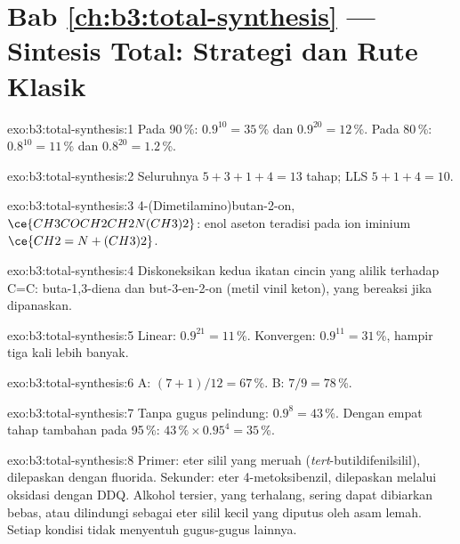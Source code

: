 \section*{Bab \ref{ch:b3:total-synthesis} --- Sintesis Total: Strategi dan Rute Klasik}

\begin{solution}{exo:b3:total-synthesis:1}
Pada 90\,\%: $0.9^{10} = 35$\,\% dan $0.9^{20} = 12$\,\%. Pada 80\,\%: $0.8^{10} = 11$\,\% dan $0.8^{20} = 1.2$\,\%.
\end{solution}

\begin{solution}{exo:b3:total-synthesis:2}
Seluruhnya $5 + 3 + 1 + 4 = 13$ tahap; LLS $5 + 1 + 4 = 10$.
\end{solution}

\begin{solution}{exo:b3:total-synthesis:3}
4-(Dimetilamino)butan-2-on, $\ce{CH3COCH2CH2N(CH3)2}$: enol aseton teradisi pada ion
iminium $\ce{CH2=N+(CH3)2}$.
\end{solution}

\begin{solution}{exo:b3:total-synthesis:4}
Diskoneksikan kedua ikatan cincin yang alilik terhadap C=C: buta-1,3-diena dan but-3-en-2-on
(metil vinil keton), yang bereaksi jika dipanaskan.
\end{solution}

\begin{solution}{exo:b3:total-synthesis:5}
Linear: $0.9^{21} = 11$\,\%. Konvergen: $0.9^{11} = 31$\,\%, hampir tiga kali lebih banyak.
\end{solution}

\begin{solution}{exo:b3:total-synthesis:6}
A: $(7 + 1)/12 = 67$\,\%. B: $7/9 = 78$\,\%.
\end{solution}

\begin{solution}{exo:b3:total-synthesis:7}
Tanpa gugus pelindung: $0.9^8 = 43$\,\%. Dengan empat tahap tambahan pada 95\,\%: $43\,\% \times 0.95^4 = 35$\,\%.
\end{solution}

\begin{solution}{exo:b3:total-synthesis:8}
Primer: eter silil yang meruah (\textit{tert}-butildifenilsilil), dilepaskan dengan fluorida.
Sekunder: eter 4-metoksibenzil, dilepaskan melalui oksidasi dengan DDQ. Alkohol
tersier, yang terhalang, sering dapat dibiarkan bebas, atau dilindungi sebagai eter silil kecil
yang diputus oleh asam lemah. Setiap kondisi tidak menyentuh gugus-gugus lainnya.
\end{solution}

